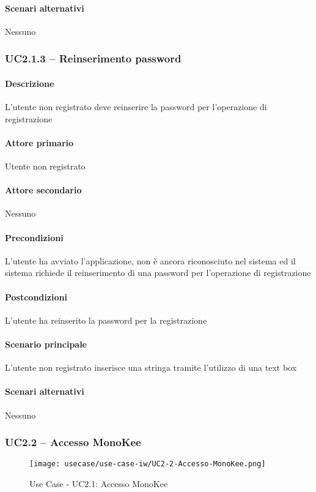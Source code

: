 \paragraph{Scenari alternativi}  Nessuno



\subsubsection{UC2.1.3 – Reinserimento password}
\paragraph{Descrizione}  L’utente non registrato deve reinserire la password per l’operazione di registrazione
\paragraph{Attore primario}  Utente non registrato
\paragraph{Attore secondario}  Nessuno
\paragraph{Precondizioni}  L’utente ha avviato l’applicazione, non è ancora riconosciuto nel sistema ed il sistema richiede il reinserimento di una password per l’operazione di registrazione
\paragraph{Postcondizioni}  L’utente ha reinserito la password per la registrazione
\paragraph{Scenario principale}  
L’utente non registrato inserisce una stringa tramite l’utilizzo di una text box
\paragraph{Scenari alternativi}  Nessuno



\subsubsection{UC2.2 – Accesso MonoKee}
\begin{figure}[!htbp] 
    \centering 
    \texttt{[image: usecase/use-case-iw/UC2-2-Accesso-MonoKee.png]} 
    \caption{Use Case - UC2.1: Accesso MonoKee}
\end{figure}


